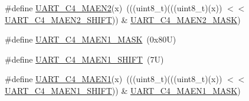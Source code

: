 \begin{DoxyCompactItemize}
\#define \mbox{\hyperlink{group___u_a_r_t___register___masks_gab2614230f0e93d3d59cf0c644411be46}{U\+A\+R\+T\+\_\+\+C4\+\_\+\+M\+A\+E\+N2}}(x)~(((uint8\+\_\+t)(((uint8\+\_\+t)(x)) $<$$<$ \mbox{\hyperlink{group___u_a_r_t___register___masks_ga5ec71022d0264fefd4c63118d90adbb2}{U\+A\+R\+T\+\_\+\+C4\+\_\+\+M\+A\+E\+N2\+\_\+\+S\+H\+I\+FT}})) \& \mbox{\hyperlink{group___u_a_r_t___register___masks_gac1c8fa0730a887b5d4d43f426b27c955}{U\+A\+R\+T\+\_\+\+C4\+\_\+\+M\+A\+E\+N2\+\_\+\+M\+A\+SK}})
\item 
\#define \mbox{\hyperlink{group___u_a_r_t___register___masks_gaa345d5da303c56b2881394dc0e003337}{U\+A\+R\+T\+\_\+\+C4\+\_\+\+M\+A\+E\+N1\+\_\+\+M\+A\+SK}}~(0x80\+U)
\item 
\#define \mbox{\hyperlink{group___u_a_r_t___register___masks_ga28655a6deae1adc48798c91db8ce24e1}{U\+A\+R\+T\+\_\+\+C4\+\_\+\+M\+A\+E\+N1\+\_\+\+S\+H\+I\+FT}}~(7\+U)
\item 
\#define \mbox{\hyperlink{group___u_a_r_t___register___masks_gafa848be1edfc0802b6988e09a2b7a3a4}{U\+A\+R\+T\+\_\+\+C4\+\_\+\+M\+A\+E\+N1}}(x)~(((uint8\+\_\+t)(((uint8\+\_\+t)(x)) $<$$<$ \mbox{\hyperlink{group___u_a_r_t___register___masks_ga28655a6deae1adc48798c91db8ce24e1}{U\+A\+R\+T\+\_\+\+C4\+\_\+\+M\+A\+E\+N1\+\_\+\+S\+H\+I\+FT}})) \& \mbox{\hyperlink{group___u_a_r_t___register___masks_gaa345d5da303c56b2881394dc0e003337}{U\+A\+R\+T\+\_\+\+C4\+\_\+\+M\+A\+E\+N1\+\_\+\+M\+A\+SK}})
\end{DoxyCompactItemize}
